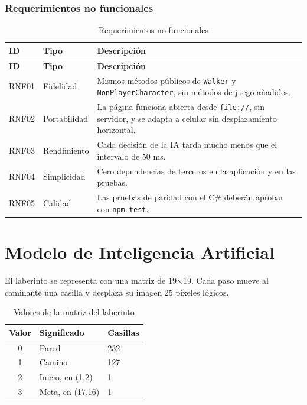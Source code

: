 \documentclass[12pt,a4paper]{article}
\begin{document}
\subsubsection{Requerimientos no funcionales}
\begin{longtable}{p{1.3cm}p{2.9cm}p{9.2cm}}
\caption{Requerimientos no funcionales}\\
\toprule
\textbf{ID} & \textbf{Tipo} & \textbf{Descripción}\\
\midrule\endfirsthead
\toprule
\textbf{ID} & \textbf{Tipo} & \textbf{Descripción}\\
\midrule\endhead
RNF01 & Fidelidad & Mismos métodos públicos de \texttt{Walker} y \texttt{NonPlayerCharacter}, sin métodos de juego añadidos.\\
RNF02 & Portabilidad & La página funciona abierta desde \texttt{file://}, sin servidor, y se adapta a celular sin desplazamiento horizontal.\\
RNF03 & Rendimiento & Cada decisión de la IA tarda mucho menos que el intervalo de 50 ms.\\
RNF04 & Simplicidad & Cero dependencias de terceros en la aplicación y en las pruebas.\\
RNF05 & Calidad & Las pruebas de paridad con el C\# deberán aprobar con \texttt{npm test}.\\
\bottomrule
\end{longtable}

\section{Modelo de Inteligencia Artificial}
El laberinto se representa con una matriz de 19$\times$19. Cada paso mueve al
caminante una casilla y desplaza su imagen 25 píxeles lógicos.

\begin{table}[H]
\centering
\caption{Valores de la matriz del laberinto}
\begin{tabular}{cll}
\toprule
\textbf{Valor} & \textbf{Significado} & \textbf{Casillas}\\
\midrule
0 & Pared & 232\\
1 & Camino & 127\\
2 & Inicio, en (1,2) & 1\\
3 & Meta, en (17,16) & 1\\
\bottomrule
\end{tabular}
\end{table}
\end{document}
